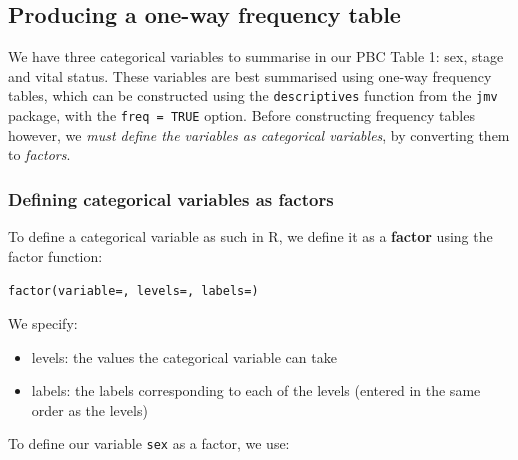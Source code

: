 \documentclass[
  a4paper,
]{memoir}
\newenvironment{Shaded}{\begin{snugshade}}{\end{snugshade}}
\newcommand{\AttributeTok}[1]{\textcolor[rgb]{0.00,0.00,0.00}{#1}}
\newcommand{\DecValTok}[1]{\textcolor[rgb]{0.00,0.00,0.00}{#1}}
\newcommand{\FunctionTok}[1]{\textcolor[rgb]{0.00,0.00,0.00}{#1}}
\newcommand{\NormalTok}[1]{\textcolor[rgb]{0.00,0.00,0.00}{#1}}
\newcommand{\OtherTok}[1]{\textcolor[rgb]{0.00,0.00,0.00}{#1}}
\newcommand{\SpecialCharTok}[1]{\textcolor[rgb]{0.00,0.00,0.00}{#1}}
\newcommand{\StringTok}[1]{\textcolor[rgb]{0.00,0.00,0.00}{#1}}
\providecommand{\tightlist}{%
  \setlength{\itemsep}{0pt}\setlength{\parskip}{0pt}}
\begin{document}
\subsection{Producing a one-way frequency
table}\label{producing-a-one-way-frequency-table-1}

We have three categorical variables to summarise in our PBC Table 1:
sex, stage and vital status. These variables are best summarised using
one-way frequency tables, which can be constructed using the
\texttt{descriptives} function from the \texttt{jmv} package, with the
\texttt{freq\ =\ TRUE} option. Before constructing frequency tables
however, we \emph{must define the variables as categorical variables},
by converting them to \emph{factors}.

\subsubsection{Defining categorical variables as
factors}\label{sec-cat-as-factors}

To define a categorical variable as such in R, we define it as a
\textbf{factor} using the factor function:

\texttt{factor(variable=,\ levels=,\ labels=)}

We specify:

\begin{itemize}
\tightlist
\item
  levels: the values the categorical variable can take
\item
  labels: the labels corresponding to each of the levels (entered in the
  same order as the levels)
\end{itemize}

To define our variable \texttt{sex} as a factor, we use:

\begin{Shaded}
\end{Shaded}
\end{document}
